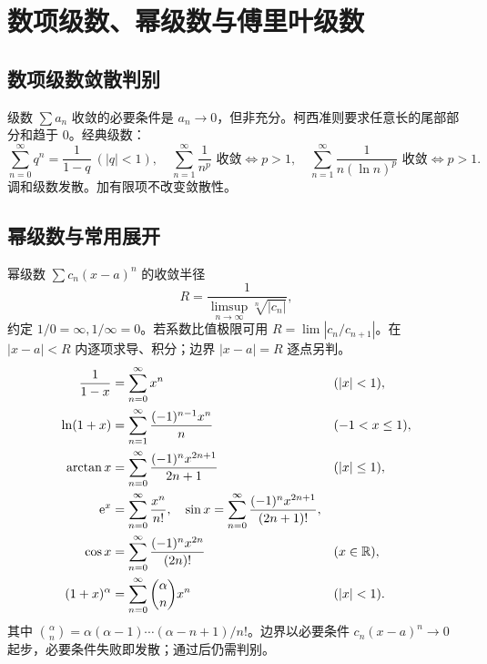 \chapter{数项级数、幂级数与傅里叶级数}
\section{数项级数敛散判别}
级数 $\sum a_n$ 收敛的必要条件是 $a_n\to0$，但非充分。柯西准则要求任意长的尾部部分和趋于 0。经典级数：
\[
\sum_{n=0}^\infty q^n=\frac1{1-q}\ (|q|<1),\quad
\sum_{n=1}^\infty\frac1{n^p}\text{ 收敛}\iff p>1,\quad
\sum_{n=1}^\infty\frac1{n(\ln n)^p}\text{ 收敛}\iff p>1.
\]
调和级数发散。加有限项不改变敛散性。

\section{幂级数与常用展开}
幂级数 $\sum c_n(x-a)^n$ 的收敛半径
\[
R=\frac1{\limsup_{n\to\infty}\sqrt[n]{|c_n|}},
\]
约定 $1/0=\infty,1/\infty=0$。若系数比值极限可用 $R=\lim|c_n/c_{n+1}|$。在 $|x-a|<R$ 内逐项求导、积分；边界 $|x-a|=R$ 逐点另判。
\begin{align*}
\frac1{1-x}&=\sum_{n=0}^\infty x^n &&(|x|<1),\\
\ln(1+x)&=\sum_{n=1}^\infty\frac{(-1)^{n-1}x^n}{n} &&(-1<x\le1),\\
\arctan x&=\sum_{n=0}^\infty\frac{(-1)^nx^{2n+1}}{2n+1} &&(|x|\le1),\\
\mathrm e^x&=\sum_{n=0}^\infty\frac{x^n}{n!},\quad
\sin x=\sum_{n=0}^\infty\frac{(-1)^nx^{2n+1}}{(2n+1)!},\\
\cos x&=\sum_{n=0}^\infty\frac{(-1)^nx^{2n}}{(2n)!} &&(x\in\mathbb R),\\
(1+x)^\alpha&=\sum_{n=0}^\infty\binom\alpha n x^n &&(|x|<1).
\end{align*}
其中 $\binom\alpha n=\alpha(\alpha-1)\cdots(\alpha-n+1)/n!$。边界以必要条件 $c_n(x-a)^n\to0$ 起步，必要条件失败即发散；通过后仍需判别。

